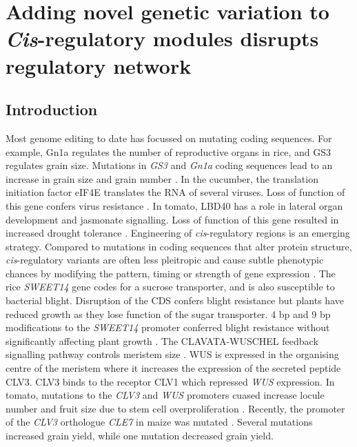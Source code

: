 \documentclass[../main.tex]{subfiles}
\begin{document}
\chapter{Adding novel genetic variation to \textit{Cis}\hyp{}regulatory modules disrupts regulatory network}\label{chapter7}
\section{Introduction}\label{chapter7:introduction}
Most genome editing to date has focussed on mutating coding sequences.
For example, Gn1a regulates the number of reproductive organs in rice, and GS3 regulates grain size.
Mutations in \textit{GS3} and \textit{Gn1a} coding sequences lead to an increase in grain size and grain number \autocite{shenQTLEditingConfers2018}.
In the cucumber, the translation initiation factor eIF4E translates the RNA of several viruses.
Loss of function of this gene confers virus resistance \autocite{chandrasekaranDevelopmentBroadVirus2016}.
In tomato, LBD40 has a role in lateral organ development and jasmonate signalling.
Loss of function of this gene resulted in increased drought tolerance \autocite{liuCRISPRCas9Targeted2020}.
Engineering of \textit{cis}\hyp{}regulatory regions is an emerging strategy.
Compared to mutations in coding sequences that alter protein structure, \textit{cis}\hyp{}regulatory variants are often less pleitropic and cause subtle phenotypic chances by modifying the pattern, timing or strength of gene expression \autocite{wittkoppCisregulatoryElementsMolecular2012}.
The rice \textit{SWEET14} gene codes for a sucrose transporter, and is also susceptible to bacterial blight.
Disruption of the CDS confers blight resistance but plants have reduced growth as they lose function of the sugar transporter.
4 bp and 9 bp modifications to the \textit{SWEET14} promoter conferred blight resistance without significantly affecting plant growth \autocite{liHighefficiencyTALENbasedGene2012}.
The CLAVATA-WUSCHEL feedback signalling pathway controls meristem size \autocite{somssichCLAVATAWUSCHELSignalingShoot2016}.
WUS is expressed in the organising centre of the meristem where it increases the expression of the secreted peptide CLV3.
CLV3 binds to the receptor CLV1 which repressed \textit{WUS} expression.
In tomato, mutations to the \textit{CLV3} and \textit{WUS} promoters cuased increase locule number and fruit size due to stem cell overproliferation \autocite{rodriguez-lealEngineeringQuantitativeTrait2017}.
Recently, the promoter of the \textit{CLV3} orthologue \textit{CLE7} in maize was mutated \autocite{liuEnhancingGrainyieldrelatedTraits2021}.
Several mutations increased grain yield, while one mutation decreased grain yield.
\end{document}
